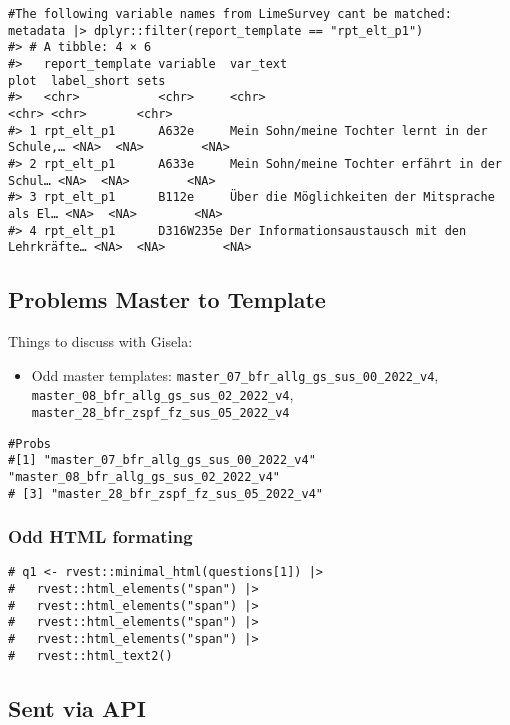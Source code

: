 \begin{verbatim}
#The following variable names from LimeSurvey cant be matched: 
metadata |> dplyr::filter(report_template == "rpt_elt_p1") 
#> # A tibble: 4 × 6
#>   report_template variable  var_text                                      plot  label_short sets 
#>   <chr>           <chr>     <chr>                                         <chr> <chr>       <chr>
#> 1 rpt_elt_p1      A632e     Mein Sohn/meine Tochter lernt in der Schule,… <NA>  <NA>        <NA> 
#> 2 rpt_elt_p1      A633e     Mein Sohn/meine Tochter erfährt in der Schul… <NA>  <NA>        <NA> 
#> 3 rpt_elt_p1      B112e     Über die Möglichkeiten der Mitsprache als El… <NA>  <NA>        <NA> 
#> 4 rpt_elt_p1      D316W235e Der Informationsaustausch mit den Lehrkräfte… <NA>  <NA>        <NA>
\end{verbatim}

\subsection{Problems Master to
Template}\label{problems-master-to-template}

Things to discuss with Gisela:

\begin{itemize}
\tightlist
\item
  Odd master templates:
  \texttt{master\_07\_bfr\_allg\_gs\_sus\_00\_2022\_v4},
  \texttt{master\_08\_bfr\_allg\_gs\_sus\_02\_2022\_v4},
  \texttt{master\_28\_bfr\_zspf\_fz\_sus\_05\_2022\_v4}
\end{itemize}

\begin{verbatim}
#Probs
#[1] "master_07_bfr_allg_gs_sus_00_2022_v4" "master_08_bfr_allg_gs_sus_02_2022_v4"
# [3] "master_28_bfr_zspf_fz_sus_05_2022_v4"
\end{verbatim}

\subsubsection{Odd HTML formating}\label{odd-html-formating}

\begin{verbatim}
# q1 <- rvest::minimal_html(questions[1]) |> 
#   rvest::html_elements("span") |> 
#   rvest::html_elements("span") |> 
#   rvest::html_elements("span") |> 
#   rvest::html_elements("span") |> 
#   rvest::html_text2()
\end{verbatim}

\subsection{Sent via API}\label{sent-via-api}

